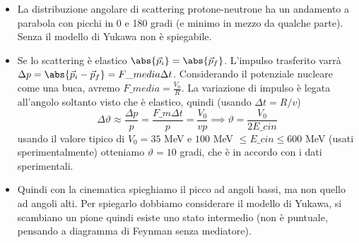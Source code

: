 \begin{itemize}
    \item La distribuzione angolare di scattering protone-neutrone ha un andamento a parabola con picchi in 0 e 180 gradi (e minimo in mezzo da qualche parte). Senza il modello di Yukawa non è spiegabile.
    \item Se lo scattering è elastico $\abs{\vec p_i}=\abs{\vec p_f}$. L'impulso trasferito varrà $\Delta p = \abs{\vec p_i-\vec p_f}=F\_{media}\Delta t$. Considerando il potenziale nucleare come una buca, avremo $F\_{media}=\frac{V_0}R$. La variazione di impulso è legata all'angolo soltanto visto che è elastico, quindi  (usando $\Delta t=R/v$)
    \begin{equation*}
        \Delta \vartheta\approx \frac{\Delta p} p=\frac{F\_m\Delta t}p=\frac{V_0}{vp}\implies \vartheta=\frac{V_0}{2E\_{cin}}
    \end{equation*}
    usando il valore tipico di $V_0=35$ MeV e $100$ MeV $\leq E\_{cin}\leq600$ MeV (usati sperimentalmente) otteniamo $\vartheta=10$ gradi, che è in accordo con i dati sperimentali. 
    \item Quindi con la cinematica spieghiamo il picco ad angoli bassi, ma non quello ad angoli alti. Per spiegarlo dobbiamo considerare il modello di Yukawa, si scambiano un pione quindi esiste uno stato intermedio (non è puntuale, pensando a diagramma di Feynman senza mediatore).
\end{itemize}